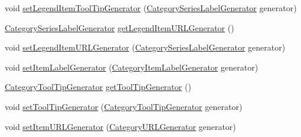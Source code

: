 \begin{DoxyCompactItemize}
\item 
void \mbox{\hyperlink{classorg_1_1jfree_1_1chart_1_1renderer_1_1category_1_1_abstract_category_item_renderer_aea6efd422135015d90c2ced64c82090d}{set\+Legend\+Item\+Tool\+Tip\+Generator}} (\mbox{\hyperlink{interfaceorg_1_1jfree_1_1chart_1_1labels_1_1_category_series_label_generator}{Category\+Series\+Label\+Generator}} generator)
\item 
\mbox{\hyperlink{interfaceorg_1_1jfree_1_1chart_1_1labels_1_1_category_series_label_generator}{Category\+Series\+Label\+Generator}} \mbox{\hyperlink{classorg_1_1jfree_1_1chart_1_1renderer_1_1category_1_1_abstract_category_item_renderer_a1d5b553663f69bcddf3a57dfed428c61}{get\+Legend\+Item\+U\+R\+L\+Generator}} ()
\item 
void \mbox{\hyperlink{classorg_1_1jfree_1_1chart_1_1renderer_1_1category_1_1_abstract_category_item_renderer_a27aede0810b3802871923f1b20c59604}{set\+Legend\+Item\+U\+R\+L\+Generator}} (\mbox{\hyperlink{interfaceorg_1_1jfree_1_1chart_1_1labels_1_1_category_series_label_generator}{Category\+Series\+Label\+Generator}} generator)
\item 
void \mbox{\hyperlink{classorg_1_1jfree_1_1chart_1_1renderer_1_1category_1_1_abstract_category_item_renderer_a015b1d8609ab314a0192920d79dbdb8d}{set\+Item\+Label\+Generator}} (\mbox{\hyperlink{interfaceorg_1_1jfree_1_1chart_1_1labels_1_1_category_item_label_generator}{Category\+Item\+Label\+Generator}} generator)
\item 
\mbox{\hyperlink{interfaceorg_1_1jfree_1_1chart_1_1labels_1_1_category_tool_tip_generator}{Category\+Tool\+Tip\+Generator}} \mbox{\hyperlink{classorg_1_1jfree_1_1chart_1_1renderer_1_1category_1_1_abstract_category_item_renderer_a82f173869f7f55aa7ca6bf59a58dac6f}{get\+Tool\+Tip\+Generator}} ()
\item 
void \mbox{\hyperlink{classorg_1_1jfree_1_1chart_1_1renderer_1_1category_1_1_abstract_category_item_renderer_a19ad9dfc587403a06c97595c3f28800a}{set\+Tool\+Tip\+Generator}} (\mbox{\hyperlink{interfaceorg_1_1jfree_1_1chart_1_1labels_1_1_category_tool_tip_generator}{Category\+Tool\+Tip\+Generator}} generator)
\item 
void \mbox{\hyperlink{classorg_1_1jfree_1_1chart_1_1renderer_1_1category_1_1_abstract_category_item_renderer_a2c58205b64cd00e63f486d160cf77bfd}{set\+Item\+U\+R\+L\+Generator}} (\mbox{\hyperlink{interfaceorg_1_1jfree_1_1chart_1_1urls_1_1_category_u_r_l_generator}{Category\+U\+R\+L\+Generator}} generator)
\end{DoxyCompactItemize}
